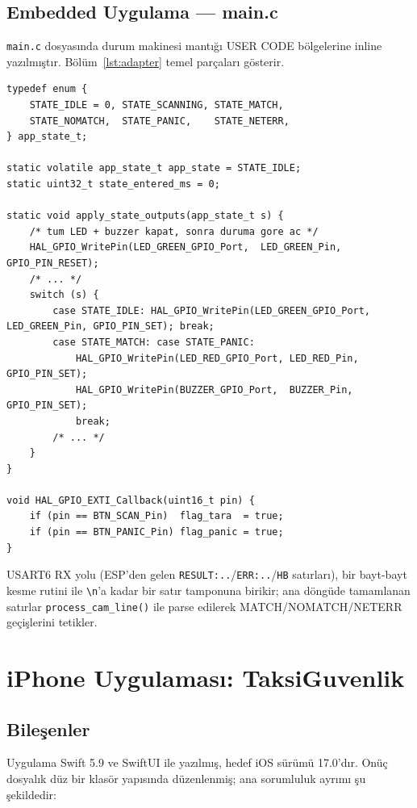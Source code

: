 \subsection{Embedded Uygulama --- main.c}

\texttt{main.c} dosyasında durum makinesi mantığı USER CODE bölgelerine
inline yazılmıştır. Bölüm~\ref{lst:adapter} temel parçaları gösterir.

\begin{lstlisting}[language=none, caption={CubeIDE main.c içerisindeki durum makinesi gerçeklemesi (özet).}, label=lst:adapter]
typedef enum {
    STATE_IDLE = 0, STATE_SCANNING, STATE_MATCH,
    STATE_NOMATCH,  STATE_PANIC,    STATE_NETERR,
} app_state_t;

static volatile app_state_t app_state = STATE_IDLE;
static uint32_t state_entered_ms = 0;

static void apply_state_outputs(app_state_t s) {
    /* tum LED + buzzer kapat, sonra duruma gore ac */
    HAL_GPIO_WritePin(LED_GREEN_GPIO_Port,  LED_GREEN_Pin,  GPIO_PIN_RESET);
    /* ... */
    switch (s) {
        case STATE_IDLE: HAL_GPIO_WritePin(LED_GREEN_GPIO_Port, LED_GREEN_Pin, GPIO_PIN_SET); break;
        case STATE_MATCH: case STATE_PANIC:
            HAL_GPIO_WritePin(LED_RED_GPIO_Port, LED_RED_Pin, GPIO_PIN_SET);
            HAL_GPIO_WritePin(BUZZER_GPIO_Port,  BUZZER_Pin,  GPIO_PIN_SET);
            break;
        /* ... */
    }
}

void HAL_GPIO_EXTI_Callback(uint16_t pin) {
    if (pin == BTN_SCAN_Pin)  flag_tara  = true;
    if (pin == BTN_PANIC_Pin) flag_panic = true;
}
\end{lstlisting}

USART6 RX yolu (ESP'den gelen \texttt{RESULT:..}/\texttt{ERR:..}/\texttt{HB}
satırları), bir bayt-bayt kesme rutini ile \texttt{\textbackslash n}'a kadar bir
satır tamponuna birikir; ana döngüde tamamlanan satırlar
\texttt{process\_cam\_line()} ile parse edilerek MATCH/NOMATCH/NETERR
geçişlerini tetikler.

\section{iPhone Uygulaması: TaksiGuvenlik}

\subsection{Bileşenler}

Uygulama Swift 5.9 ve SwiftUI ile yazılmış, hedef iOS sürümü 17.0'dır.
Onüç dosyalık düz bir klasör yapısında düzenlenmiş; ana sorumluluk
ayrımı şu şekildedir:

